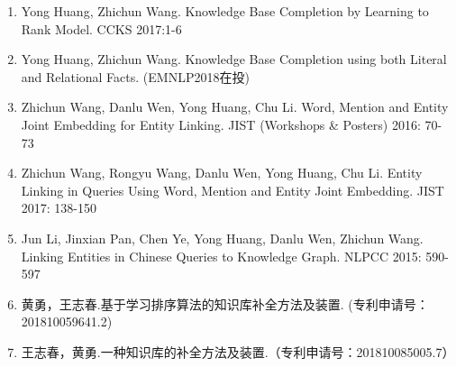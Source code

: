 \begin{paper}
\begin{enumerate}
  \item Yong Huang, Zhichun Wang. Knowledge Base Completion by Learning to Rank Model. CCKS 2017:1-6
  \item Yong Huang, Zhichun Wang. Knowledge Base Completion using both Literal and Relational Facts. (EMNLP2018在投)
  \item Zhichun Wang, Danlu Wen, Yong Huang, Chu Li.
Word, Mention and Entity Joint Embedding for Entity Linking. JIST (Workshops \& Posters) 2016: 70-73
 \item Zhichun Wang, Rongyu Wang, Danlu Wen, Yong Huang, Chu Li.
Entity Linking in Queries Using Word, Mention and Entity Joint Embedding. JIST 2017: 138-150
  \item Jun Li, Jinxian Pan, Chen Ye, Yong Huang, Danlu Wen, Zhichun Wang.
  Linking Entities in Chinese Queries to Knowledge Graph. NLPCC 2015: 590-597
  \item 黄勇，王志春.基于学习排序算法的知识库补全方法及装置. (专利申请号：201810059641.2)
  \item 王志春，黄勇.一种知识库的补全方法及装置.（专利申请号：201810085005.7）
  \end{enumerate}
\end{paper}
